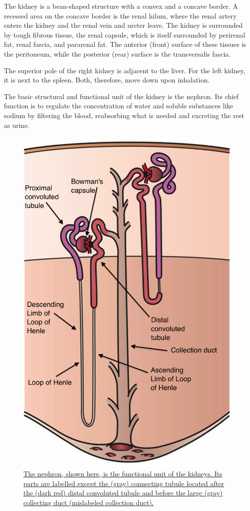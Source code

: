 The kidney is a bean-shaped structure with a convex and a concave border. A recessed area on the concave border is the renal hilum, where the renal artery enters the kidney and the renal vein and ureter leave. The kidney is surrounded by tough fibrous tissue, the renal capsule, which is itself surrounded by perirenal fat, renal fascia, and pararenal fat. The anterior (front) surface of these tissues is the peritoneum, while the posterior (rear) surface is the transversalis fascia.

The superior pole of the right kidney is adjacent to the liver. For the left kidney, it is next to the spleen. Both, therefore, move down upon inhalation.

The basic structural and functional unit of the kidney is the nephron. Its chief function is to regulate the concentration of water and soluble substances like sodium by filtering the blood, reabsorbing what is needed and excreting the rest as urine.



\begin{figure}

{\centering \includegraphics[width=0.7\linewidth]{./figures/excretory/Kidney_Nephron} 

}

\caption{\href{https://commons.wikimedia.org/wiki/File:Kidney_Nephron.png}{The nephron, shown here, is the functional unit of the kidneys. Its parts are labelled except the (gray) connecting tubule located after the (dark red) distal convoluted tubule and before the large (gray) collecting duct (mislabeled collection duct).}}\label{fig:nephron}
\end{figure}

